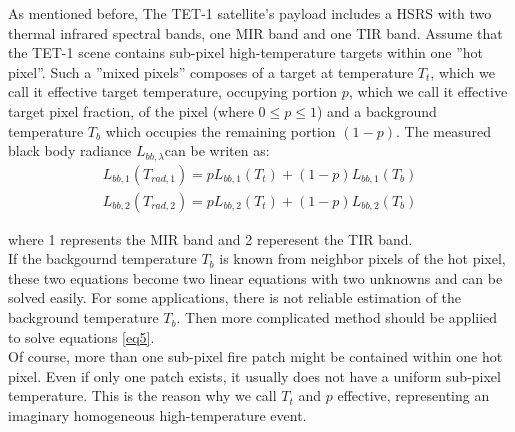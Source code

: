 \noindent As mentioned before, The TET-1 satellite's payload includes a HSRS with two thermal infrared spectral bands, one MIR band and one TIR band. Assume that the TET-1 scene contains sub-pixel high-temperature targets within one ''hot pixel''. Such a ''mixed pixels'' composes of a target at temperature $T_t$, which we call it effective target temperature, occupying portion $p$, which we call it effective target pixel fraction, of the pixel (where $0 \leqslant p \leqslant 1$) and a background temperature $T_b$ which occupies the remaining portion $(1 - p)$. The measured black body radiance $L_{bb, \lambda}$can be writen as:\\
\begin{equation}
\begin{aligned}
\label{eq5}
L_{bb, 1}(T_{rad, 1}) = pL_{bb, 1}(T_t) + (1 - p)L_{bb, 1}(T_b)\\
L_{bb, 2}(T_{rad, 2}) = pL_{bb, 2}(T_t) + (1 - p)L_{bb, 2}(T_b)
\end{aligned}
\end{equation}

\noindent where 1 represents the MIR band and 2 reperesent the TIR band.\\

\noindent If the backgournd temperature $T_b$ is known from neighbor pixels of the hot pixel, these two equations become two linear equations with two unknowns and can be solved easily. For some applications, there is not reliable estimation of the background temperature $T_b$. Then more complicated method should be appliied to solve equations \eqref{eq5}.\\

\noindent Of course, more than one sub-pixel fire patch might be contained within one hot pixel. Even if only one patch exists, it usually does not have a uniform sub-pixel temperature. This is the reason why we call $T_t$ and $p$ effective, representing an imaginary homogeneous high-temperature event.


